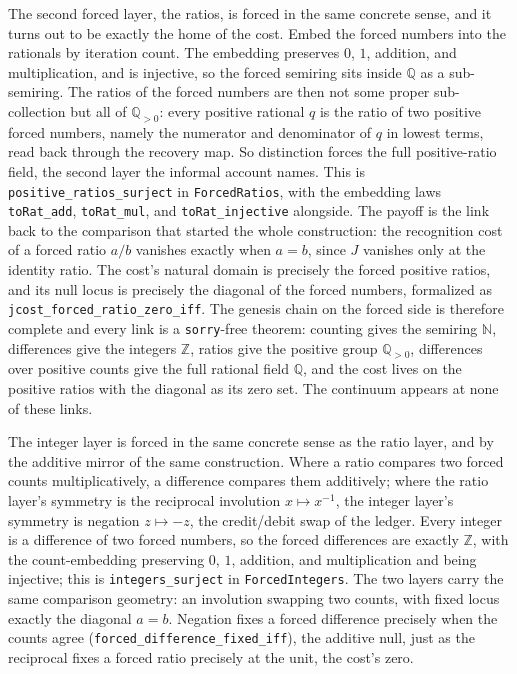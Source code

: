 \documentclass[11pt,a4paper]{article}
\theoremstyle{definition}
\theoremstyle{remark}
\begin{document}
The second forced layer, the ratios, is forced in the same concrete sense, and it
turns out to be exactly the home of the cost. Embed the forced numbers into the
rationals by iteration count. The embedding preserves $0$, $1$, addition, and
multiplication, and is injective, so the forced semiring sits inside $\mathbb{Q}$
as a sub-semiring. The ratios of the forced numbers are then not some proper
sub-collection but all of $\mathbb{Q}_{>0}$: every positive rational $q$ is the
ratio of two positive forced numbers, namely the numerator and denominator of $q$
in lowest terms, read back through the recovery map. So distinction forces the
full positive-ratio field, the second layer the informal account names. This is
\texttt{positive\_ratios\_surject} in \texttt{ForcedRatios}, with the embedding
laws \texttt{toRat\_add}, \texttt{toRat\_mul}, and \texttt{toRat\_injective}
alongside. The payoff is the link back to the comparison that started the whole
construction: the recognition cost of a forced ratio $a/b$ vanishes exactly when
$a=b$, since $J$ vanishes only at the identity ratio. The cost's natural domain is
precisely the forced positive ratios, and its null locus is precisely the diagonal
of the forced numbers, formalized as \texttt{jcost\_forced\_ratio\_zero\_iff}. The
genesis chain on the forced side is therefore complete and every link is a
\texttt{sorry}-free theorem: counting gives the semiring $\mathbb{N}$, differences
give the integers $\mathbb{Z}$, ratios give the positive group $\mathbb{Q}_{>0}$,
differences over positive counts give the full rational field $\mathbb{Q}$, and the
cost lives on the positive ratios with the diagonal as its zero set. The continuum
appears at none of these links.

The integer layer is forced in the same concrete sense as the ratio layer, and by
the additive mirror of the same construction. Where a ratio compares two forced
counts multiplicatively, a difference compares them additively; where the ratio
layer's symmetry is the reciprocal involution $x\mapsto x^{-1}$, the integer
layer's symmetry is negation $z\mapsto -z$, the credit/debit swap of the ledger.
Every integer is a difference of two forced numbers, so the forced differences are
exactly $\mathbb{Z}$, with the count-embedding preserving $0$, $1$, addition, and
multiplication and being injective; this is \texttt{integers\_surject} in
\texttt{ForcedIntegers}. The two layers carry the same comparison geometry: an
involution swapping two counts, with fixed locus exactly the diagonal $a=b$.
Negation fixes a forced difference precisely when the counts agree
(\texttt{forced\_difference\_fixed\_iff}), the additive null, just as the
reciprocal fixes a forced ratio precisely at the unit, the cost's zero.
\end{document}
